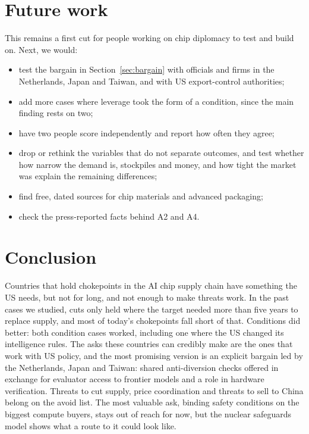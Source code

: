 \documentclass[11pt]{article}
\begin{document}
\section{Future work}

This remains a first cut for people working on chip diplomacy to test and build on. Next, we would:

\begin{itemize}[leftmargin=*]
\item test the bargain in Section~\ref{sec:bargain} with officials and firms in the Netherlands, Japan and Taiwan, and with US export-control authorities;
\item add more cases where leverage took the form of a condition, since the main finding rests on two;
\item have two people score independently and report how often they agree;
\item drop or rethink the variables that do not separate outcomes, and test whether how narrow the demand is, stockpiles and money, and how tight the market was explain the remaining differences;
\item find free, dated sources for chip materials and advanced packaging;
\item check the press-reported facts behind A2 and A4.
\end{itemize}

\section{Conclusion}

Countries that hold chokepoints in the AI chip supply chain have something the US needs, but not for long, and not enough to make threats work. In the past cases we studied, cuts only held where the target needed more than five years to replace supply, and most of today's chokepoints fall short of that. Conditions did better: both condition cases worked, including one where the US changed its intelligence rules. The asks these countries can credibly make are the ones that work with US policy, and the most promising version is an explicit bargain led by the Netherlands, Japan and Taiwan: shared anti-diversion checks offered in exchange for evaluator access to frontier models and a role in hardware verification. Threats to cut supply, price coordination and threats to sell to China belong on the avoid list. The most valuable ask, binding safety conditions on the biggest compute buyers, stays out of reach for now, but the nuclear safeguards model shows what a route to it could look like.
\end{document}
